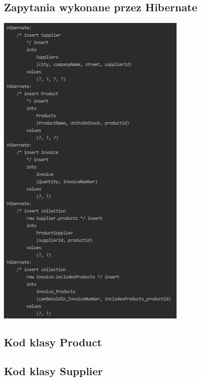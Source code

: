 \documentclass[a4paper, 11pt]{article}
\begin{document}
    \subsection{Zapytania wykonane przez Hibernate}
    \begin{center}
        \includegraphics[scale=1.3]{images/point7/hibernateQueries.png}
    \end{center}

    \newpage

    \subsection{Kod klasy Product}
    

    \newpage

    \subsection{Kod klasy Supplier}
    
\end{document}
